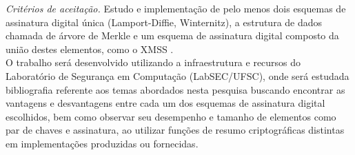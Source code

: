 \documentclass{article}
\begin{document}
\noindent \emph{Critérios de aceitação.} Estudo e implementação de pelo menos
dois esquemas de assinatura digital única (Lamport-Diffie, Winternitz),
a estrutura de dados chamada de árvore de Merkle e um esquema de assinatura
digital composto da união destes elementos, como o XMSS \cite{Buchmann2011}. \\

O trabalho será desenvolvido utilizando a infraestrutura e recursos do
Laboratório de Segurança em Computação (LabSEC/UFSC), onde será estudada
bibliografia referente aos temas abordados nesta pesquisa buscando encontrar
as vantagens e desvantagens entre cada um dos esquemas de assinatura digital
escolhidos, bem como observar seu desempenho e tamanho de elementos como
par de chaves e assinatura, ao utilizar funções de resumo criptográficas
distintas em implementações produzidas ou fornecidas.



\end{document}
